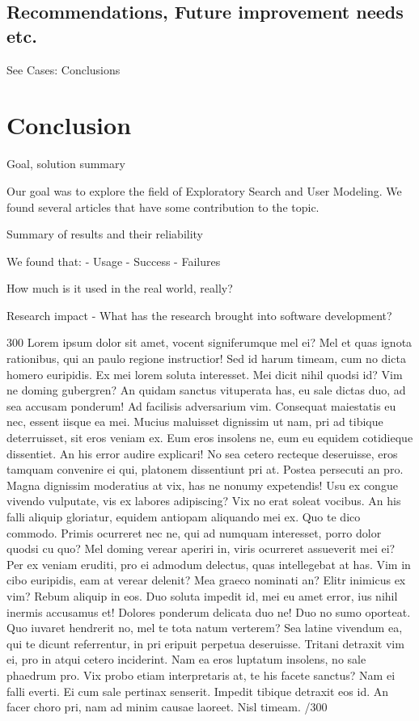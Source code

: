 \documentclass{sigchi}
\begin{document}
\subsection{Recommendations, Future improvement needs etc.}

See Cases: Conclusions

\section{Conclusion}
Goal, solution summary

Our goal was to explore the field of Exploratory Search and User Modeling. We found several articles that have some contribution to the topic.

Summary of results and their reliability 

We found that:
- Usage
- Success
- Failures

How much is it used in the real world, really?

Research impact
- What has the research brought into software development?

300 Lorem ipsum dolor sit amet, vocent signiferumque mel ei? Mel et quas ignota rationibus, qui an paulo regione instructior! Sed id harum timeam, cum no dicta homero euripidis. Ex mei lorem soluta interesset. Mei dicit nihil quodsi id? Vim ne doming gubergren? An quidam sanctus vituperata has, eu sale dictas duo, ad sea accusam ponderum! Ad facilisis adversarium vim. Consequat maiestatis eu nec, essent iisque ea mei. Mucius maluisset dignissim ut nam, pri ad tibique deterruisset, sit eros veniam ex. Eum eros insolens ne, eum eu equidem cotidieque dissentiet. An his error audire explicari! No sea cetero recteque deseruisse, eros tamquam convenire ei qui, platonem dissentiunt pri at. Postea persecuti an pro. Magna dignissim moderatius at vix, has ne nonumy expetendis! Usu ex congue vivendo vulputate, vis ex labores adipiscing? Vix no erat soleat vocibus. An his falli aliquip gloriatur, equidem antiopam aliquando mei ex. Quo te dico commodo. Primis ocurreret nec ne, qui ad numquam interesset, porro dolor quodsi cu quo? Mel doming verear aperiri in, viris ocurreret assueverit mei ei? Per ex veniam eruditi, pro ei admodum delectus, quas intellegebat at has. Vim in cibo euripidis, eam at verear delenit? Mea graeco nominati an? Elitr inimicus ex vim? Rebum aliquip in eos. Duo soluta impedit id, mei eu amet error, ius nihil inermis accusamus et! Dolores ponderum delicata duo ne! Duo no sumo oporteat. Quo iuvaret hendrerit no, mel te tota natum verterem? Sea latine vivendum ea, qui te dicunt referrentur, in pri eripuit perpetua deseruisse. Tritani detraxit vim ei, pro in atqui cetero inciderint. Nam ea eros luptatum insolens, no sale phaedrum pro. Vix probo etiam interpretaris at, te his facete sanctus? Nam ei falli everti. Ei cum sale pertinax senserit. Impedit tibique detraxit eos id. An facer choro pri, nam ad minim causae laoreet. Nisl timeam. /300
\end{document}
